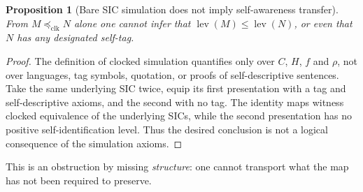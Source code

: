\documentclass[11pt,letterpaper]{article}
\newtheorem{proposition}[theorem]{Proposition}
\theoremstyle{definition}\newtheorem{definition}[theorem]{Definition}\newtheorem{example}[theorem]{Example}\newtheorem{protocol}[theorem]{Protocol}\newtheorem{question}[theorem]{Open Problem}
\theoremstyle{remark}\newtheorem{remark}[theorem]{Remark}
\newcommand{\lev}{\operatorname{lev}}
\newcommand{\clksim}{\preceq_{\mathrm{clk}}}
\begin{document}
\begin{proposition}[Bare SIC simulation does not imply self-awareness transfer]\label{prop:bare}
From $M\clksim N$ alone one cannot infer that $\lev(M)\le\lev(N)$, or even that $N$ has any designated self-tag.
\end{proposition}
\begin{proof}
The definition of clocked simulation quantifies only over $C$, $H$, $f$ and $\rho$, not over languages, tag symbols, quotation, or proofs of self-descriptive sentences. Take the same underlying SIC twice, equip its first presentation with a tag and self-descriptive axioms, and the second with no tag. The identity maps witness clocked equivalence of the underlying SICs, while the second presentation has no positive self-identification level. Thus the desired conclusion is not a logical consequence of the simulation axioms.
\end{proof}
This is an obstruction by missing \emph{structure}: one cannot transport what the map has not been required to preserve.
\end{document}
